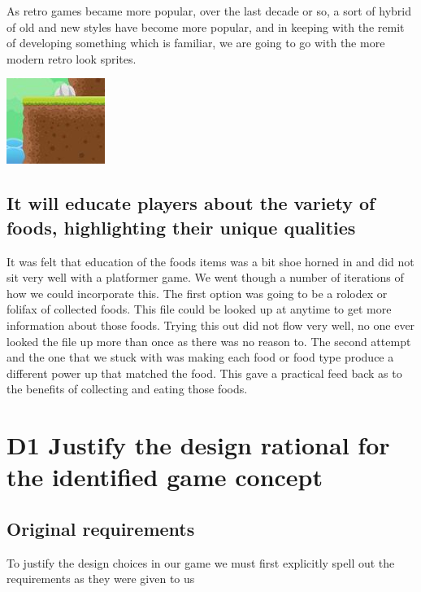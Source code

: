 \documentclass{article}
\begin{document}
As retro games became more popular, over the last decade or so, a sort of hybrid of old and new styles have become more popular, and in keeping with the remit of developing something which is familiar, we are going to go with the more modern retro look sprites.

\includegraphics[scale=0.5]{SoftSprite}


\subsection{ It will educate players about the variety of foods, highlighting their unique qualities }
It was felt that education of the foods items was a bit shoe horned in and did not sit very well with a platformer game.
We went though a number of iterations of how we could incorporate this. The first option was going to be a rolodex or folifax of collected foods. This file could be looked up at anytime to get more information about those foods.
Trying this out did not flow very well, no one ever looked the file up more than once as there was no reason to.
The second attempt and the one that we stuck with was making each food or food type produce a different power up that matched the food. This gave a practical feed back as to the benefits of collecting and eating those foods.

\section{D1 Justify the design rational for the identified game concept}


\subsection{Original requirements}
To justify the design choices in our game we must first explicitly spell out the requirements as they were given to us
\end{document}
